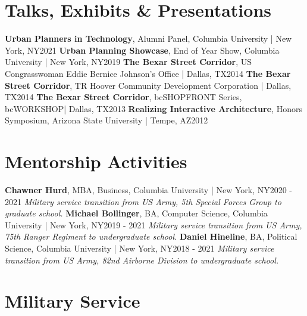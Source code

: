 \documentclass{article}
\begin{document}
    \section*{Talks, Exhibits \& Presentations}
        \textbf{Urban Planners in Technology}, Alumni Panel, Columbia University | New York, NY\hfill{2021}\newline
        \textbf{Urban Planning Showcase}, End of Year Show, Columbia University | New York, NY\hfill{2019}\newline
        \textbf{The Bexar Street Corridor}, US Congrasswoman Eddie Bernice Johnson's Office | Dallas, TX\hfill{2014}\newline
        \textbf{The Bexar Street Corridor}, TR Hoover Community Development Corporation | Dallas, TX\hfill{2014}\newline
        \textbf{The Bexar Street Corridor}, bcSHOPFRONT Series, bcWORKSHOP| Dallas, TX\hfill{2013}\newline
        \textbf{Realizing Interactive Architecture}, Honors Symposium, Arizona State University | Tempe, AZ\hfill{2012}
    \section*{Mentorship Activities}
        \textbf{Chawner Hurd}, MBA, Business, Columbia University | New York, NY\hfill{2020 - 2021}\newline
        \textit{Military service transition from US Army, 5th Special Forces Group to graduate school.}\newline\newline
        \textbf{Michael Bollinger}, BA, Computer Science, Columbia University | New York, NY\hfill{2019 - 2021}\newline
        \textit{Military service transition from US Army, 75th Ranger Regiment to undergraduate school.}\newline\newline
        \textbf{Daniel Hineline}, BA, Political Science, Columbia University | New York, NY\hfill{2018 - 2021}\newline
        \textit{Military service transition from US Army, 82nd Airborne Division to undergraduate school.}
    \section*{Military Service}
\end{document}
